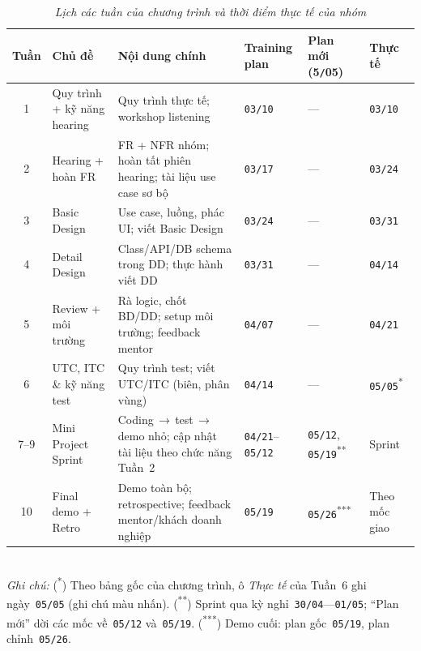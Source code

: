 \begin{table}[H]
    \centering
    \scriptsize
    \setlength{\tabcolsep}{2.5pt}
    \renewcommand{\arraystretch}{1.2}
    \begin{tabular}{|c|p{2.7cm}|p{3.85cm}|p{1.95cm}|p{1.95cm}|p{1.95cm}|}
        \hline
        \textbf{Tuần} & \textbf{Chủ đề} & \textbf{Nội dung chính} & \textbf{Training plan} & \textbf{Plan mới (5\texttt{/}05)} & \textbf{Thực tế} \\
        \hline
        1 & Quy trình + kỹ năng hearing & Quy trình thực tế; workshop listening & \texttt{03/10} & --- & \texttt{03/10} \\
        \hline
        2 & Hearing + hoàn FR & FR + NFR nhóm; hoàn tất phiên hearing; tài liệu use case sơ bộ & \texttt{03/17} & --- & \texttt{03/24} \\
        \hline
        3 & Basic Design & Use case, luồng, phác UI; viết Basic Design & \texttt{03/24} & --- & \texttt{03/31} \\
        \hline
        4 & Detail Design & Class/API/DB schema trong DD; thực hành viết DD & \texttt{03/31} & --- & \texttt{04/14} \\
        \hline
        5 & Review + môi trường & Rà logic, chốt BD/DD; setup môi trường; feedback mentor & \texttt{04/07} & --- & \texttt{04/21} \\
        \hline
        6 & UTC, ITC \& kỹ năng test & Quy trình test; viết UTC/ITC (biên, phân vùng) & \texttt{04/14} & --- & \texttt{05/05}\textsuperscript{*} \\
        \hline
        7--9 & Mini Project Sprint & Coding\,\(\rightarrow\)\,test\,\(\rightarrow\)\,demo nhỏ; cập nhật tài liệu theo chức năng Tuần~2 & \texttt{04/21}--\texttt{05/12} & \texttt{05/12}, \texttt{05/19}\textsuperscript{**} & Sprint \\
        \hline
        10 & Final demo + Retro & Demo toàn bộ; retrospective; feedback mentor/khách doanh nghiệp & \texttt{05/19} & \texttt{05/26}\textsuperscript{***} & Theo mốc giao \\
        \hline
    \end{tabular}\\[4pt]
    {\scriptsize \textit{Ghi chú:} (\textsuperscript{*}) Theo bảng gốc của chương trình, ô \emph{Thực tế} của Tuần~6 ghi ngày~\texttt{05/05} (ghi chú màu nhấn). (\textsuperscript{**}) Sprint qua kỳ nghỉ~\texttt{30/04}---\texttt{01/05}; ``Plan mới'' dời các mốc về~\texttt{05/12} và~\texttt{05/19}. (\textsuperscript{***}) Demo cuối: plan gốc~\texttt{05/19}, plan chỉnh~\texttt{05/26}.}\\[4pt]
    \caption{\textit{Lịch các tuần của chương trình và thời điểm thực tế của nhóm}}
    \label{tab:plan-ivs-seai}
\end{table}

